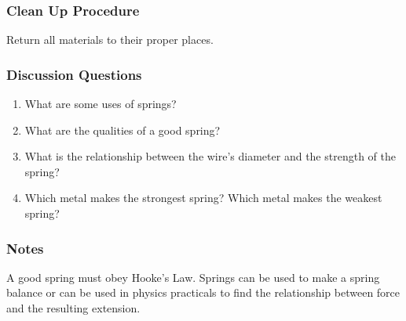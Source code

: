 \subsubsection*{Clean Up Procedure}
Return all materials to their proper places.

\subsubsection*{Discussion Questions}
\begin{enumerate}
\item{What are some uses of springs?}
\item{What are the qualities of a good spring?}
\item{What is the relationship between the wire's diameter and the strength of the spring?}
\item{Which metal makes the strongest spring?  Which metal makes the weakest spring?}
\end{enumerate}

\subsubsection*{Notes}
A good spring must obey Hooke's Law.  Springs can be used to make a spring balance or can be used in physics practicals to find the relationship between force and the resulting extension.
